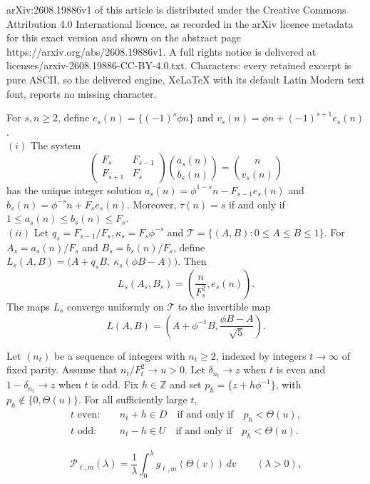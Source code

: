 \documentclass[10pt,a4paper]{amsart}
\newcommand{\Tcal}{\mathcal T}
\begin{document}
arXiv:2608.19886v1 of this article is distributed under the Creative Commons Attribution 4.0 International licence, as recorded in the arXiv licence metadata for this exact version and shown on the abstract page https://arxiv.org/abs/2608.19886v1. A full rights notice is delivered at licenses/arxiv-2608.19886-CC-BY-4.0.txt. Characters: every retained excerpt is pure ASCII, so the delivered engine, XeLaTeX with its default Latin Modern text font, reports no missing character.
\begin{lemma}\label{lem:candidate}
For $s,n\geq2$, define $e_s(n)=\{(-1)^s\phi n\}$ and $v_s(n)=\phi n+(-1)^{s+1}e_s(n)$.\\
$(i)$ The system 
\[
\begin{pmatrix}
F_s&F_{s-1}\\
F_{s+1}&F_s
\end{pmatrix}
\binom{a_s(n)}{b_s(n)}
=
\binom{n}{v_s(n)}
\]
has the unique integer solution $a_s(n)=\phi^{1-s}n-F_{s-1}e_s(n)$ and $b_s(n)=\phi^{-s}n+F_se_s(n)$. Moreover, $\tau(n)=s$ if and only if $1\leq a_s(n)\leq b_s(n)\leq F_s$.\\
$(ii)$ Let $q_s=F_{s-1}/F_s, \kappa_s=F_s\phi^{-s}$ and $\Tcal=\{(A,B):0\leq A\leq B\leq1\}$. For $A_s=a_s(n)/F_s$ and $B_s=b_s(n)/F_s$, define $L_s(A,B)=\bigl(A+q_sB,\ \kappa_s(\phi B-A)\bigr)$.
Then
\[
L_s(A_s,B_s)=\left(\frac{n}{F_s^2},e_s(n)\right).
\]
The maps $L_s$ converge uniformly on $\Tcal$ to the invertible map
\[
L(A,B)=\left(A+\phi^{-1}B,\frac{\phi B-A}{\sqrt5}\right).
\]
\end{lemma}

\begin{lemma}\label{lem:layer-coding}
Let $(n_t)$ be a sequence of integers with $n_t\geq2$, indexed by integers $t\to\infty$ of fixed parity. Assume that $n_t/F_t^2\to u>0$. Let $\delta_{n_t}\to z$ when $t$ is even and $1-\delta_{n_t}\to z$ when $t$ is odd. Fix $h\in\mathbb Z$ and set $p_h=\{z+h\phi^{-1}\}$, with $p_h\notin\{0,\Theta(u)\}$. For all sufficiently large
$t$,
\begin{align}
t\text{ even}:\quad&
n_t+h\in D\quad\text{if and only if}\quad p_h<\Theta(u),\label{eq:layer-code-D}\\
t\text{ odd}:\quad&
n_t-h\in U\quad\text{if and only if}\quad p_h<\Theta(u).
\label{eq:layer-code-U}
\end{align}
\end{lemma}

\begin{equation}\label{eq:phase-profile}
 \mathcal P_{\ell,m}(\lambda)
 =\frac1\lambda\int_0^\lambda g_{\ell,m}(\Theta(v))\,dv
 \qquad(\lambda>0),
\end{equation}
\end{document}
